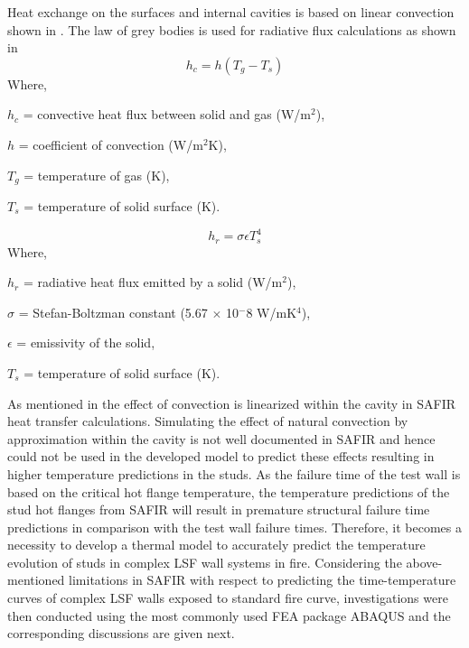 Heat exchange on the surfaces and internal cavities is based on linear convection shown in . The law of grey bodies is used for radiative flux calculations as shown in 
\begin{equation}\label{eq:safir-convection}
	h_c = h\left(T_g - T_s\right)
\end{equation}
Where,
\begin{description}[itemsep=0pt,parsep=0pt]
	\item $h_c$ = convective heat flux between solid and gas (W/m$^2$),
	\item $h$ = coefficient of convection (W/m$^2$K),
	\item $T_g$ = temperature of gas (K),
	\item $T_s$ = temperature of solid surface (K).
\end{description}
\begin{equation}\label{eq:safir-radiation}
	h_r = \sigma\epsilon T^4_s
\end{equation}
Where,
\begin{description}[itemsep=0pt,parsep=0pt]
	\item $h_r$ = radiative heat flux emitted by a solid (W/m$^2$),
	\item $\sigma$ = Stefan-Boltzman constant (5.67 $\times$ 10$^-8$ W/mK$^4$),
	\item $\epsilon$ = emissivity of the solid,
	\item $T_s$ = temperature of solid surface (K).
\end{description}

As mentioned in  the effect of convection is linearized within the cavity in SAFIR heat transfer calculations. Simulating the effect of natural convection by approximation within the cavity is not well documented in SAFIR and hence could not be used in the developed model to predict these effects resulting in higher temperature predictions in the studs. As the failure time of the test wall is based on the critical hot flange temperature, the temperature predictions of the stud hot flanges from SAFIR will result in premature structural failure time predictions in comparison with the test wall failure times. Therefore, it becomes a necessity to develop a thermal model to accurately predict the temperature evolution of studs in complex LSF wall systems in fire. Considering the above-mentioned limitations in SAFIR with respect to predicting the time-temperature curves of complex LSF walls exposed to standard fire curve, investigations were then conducted using the most commonly used FEA package ABAQUS and the corresponding discussions are given next.


